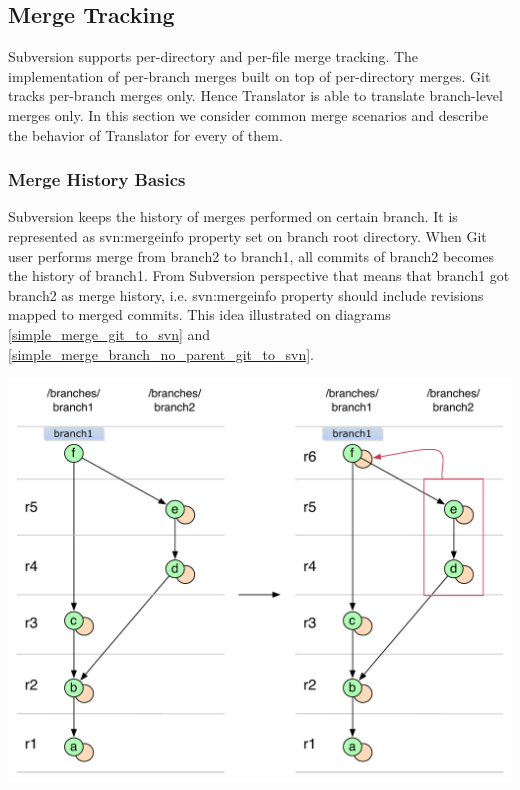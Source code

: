 \renewcommand{\figurename}{Diagram}
\subsection{Merge Tracking}

Subversion supports per-directory and per-file merge tracking. The implementation of per-branch merges built on top of per-directory merges. Git tracks per-branch merges only. Hence Translator is able to translate branch-level merges only. In this section we consider common merge scenarios and describe the behavior of Translator for every of them.

\subsubsection{Merge History Basics}

Subversion keeps the history of merges performed on certain branch. It is represented as svn:mergeinfo property set on branch root directory. When Git user performs merge from branch2 to branch1, all commits of branch2 becomes the history of branch1. From Subversion perspective that means that branch1 got branch2 as merge history, i.e. svn:mergeinfo property should include revisions mapped to merged commits. This idea illustrated on diagrams \ref{simple_merge_git_to_svn} and \ref{simple_merge_branch_no_parent_git_to_svn}.

\begin{center}
\includegraphics[width=\textwidth]{img/diagrams/simple_merge_git_to_svn.pdf}%
\label{simple_merge_git_to_svn}%
\end{center}


